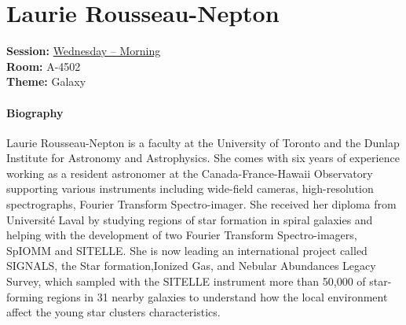 \hypertarget{invited-laurie-rousseau-nepton}{}
\label{invited-page-laurie-rousseau-nepton}
\section{Laurie Rousseau-Nepton}
\textbf{Session:} \hyperlink{schedule-wednesday-morning-a-4502}{Wednesday -- Morning}\\
\textbf{Room:} A-4502\\
\textbf{Theme:} Galaxy\\

\paragraph{Biography}
{\sffamily
Laurie Rousseau-Nepton is a faculty at the University of Toronto and the Dunlap Institute for Astronomy and Astrophysics. She comes with six years of experience working as a resident astronomer at the Canada-France-Hawaii Observatory supporting various instruments including wide-field cameras, high-resolution spectrographs, Fourier Transform Spectro-imager. She received her diploma from Université Laval by studying regions of star formation in spiral galaxies and helping with the development of two Fourier Transform Spectro-imagers, SpIOMM and SITELLE. She is now leading an international project called SIGNALS, the Star formation,Ionized Gas, and Nebular Abundances Legacy Survey, which sampled with the SITELLE instrument more than 50,000 of star-forming regions in 31 nearby galaxies to understand how the local environment affect the young star clusters characteristics.
}

